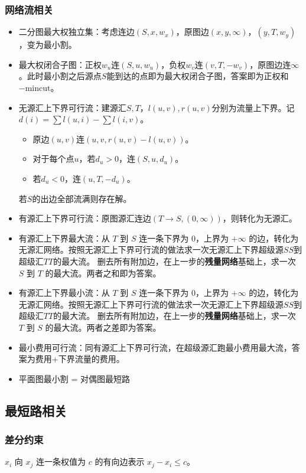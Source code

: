 \documentclass[twoside]{article}
\begin{document}
\subsubsection{网络流相关}

\begin{itemize}
    \item 二分图最大权独立集：考虑连边$(S, x, w_x)$，原图边$(x,y,\infty)$，$(y,T,w_y)$，变为最小割。
    \item 最大权闭合子图：正权$w_u$连$(S,u,w_u)$，负权$w_v$连$(v,T,-w_v)$，原图边连$\infty$。此时最小割之后源点$S$能到达的点即为最大权闭合子图，答案即为正权和$-\text{mincut}$。
    \item 无源汇上下界可行流：建源汇$S,T$，$l(u,v),r(u,v)$分别为流量上下界。记$d(i) = \sum l(u,i) - \sum l(i,v)$。
    \begin{itemize}
        \item 原边$(u,v)$连$(u,v,r(u,v)-l(u,v))$。
        \item 对于每个点$u$，若$d_u>0$，连$(S, u, d_u)$。
        \item 若$d_u<0$，连$(u, T, -d_u)$。
    \end{itemize}
    若$S$的出边全部流满则存在解。
    \item 有源汇上下界可行流：原图源汇连边$(T\to S,(0,\infty))$，则转化为无源汇。
    \item 有源汇上下界最大流：从 $T$ 到 $S$ 连一条下界为 $0$，上界为 $+\infty$ 的边，转化为无源汇网络。按照无源汇上下界可行流的做法求一次无源汇上下界超级源$SS$到超级汇$TT$的最大流。
    删去所有附加边，在上一步的\textbf{残量网络}基础上，求一次 $S$ 到 $T$ 的最大流。两者之和即为答案。
    \item 有源汇上下界最小流：从 $T$ 到 $S$ 连一条下界为 $0$，上界为 $+\infty$ 的边，转化为无源汇网络。按照无源汇上下界可行流的做法求一次无源汇上下界超级源$SS$到超级汇$TT$的最大流。
    删去所有附加边，在上一步的\textbf{残量网络}基础上，求一次 $T$ 到 $S$ 的最大流。两者之差即为答案。
    \item 最小费用可行流：同有源汇上下界可行流，在超级源汇跑最小费用最大流，答案为费用+下界流量的费用。
    \item 平面图最小割 = 对偶图最短路
\end{itemize}
\subsection{最短路相关}
\subsubsection{差分约束}
$x_i$ 向 $x_j$ 连一条权值为 $c$ 的有向边表示 $x_j - x_i \le c$。
\end{document}
